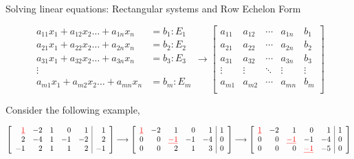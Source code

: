 \documentclass[aspectratio=169]{beamer}
\begin{document}
\begin{frame}[t]{Solving linear equations: Rectangular systems and Row Echelon Form}
\vspace{-0.5cm}
\begin{small}
\[
\begin{split}
a_{11}x_1 + a_{12}x_2 \ldots + a_{1n}x_n & = b_1 : E_1\\
a_{21}x_1 + a_{22}x_2 \ldots + a_{2n}x_n & = b_2 : E_2\\
a_{31}x_1 + a_{32}x_2 \ldots + a_{3n}x_n & = b_3 : E_3\\
\vdots &  \\
a_{m1}x_1 + a_{m2}x_2 \ldots + a_{mn}x_n & = b_m : E_m\\
\end{split} \longrightarrow
\left[
\begin{array}{cccc|c}
a_{11} & a_{12} & \cdots & a_{1n} & b_1 \\
a_{21} & a_{22} & \cdots & a_{2n} & b_2 \\
a_{31} & a_{32} & \cdots & a_{3n} & b_3 \\
\vdots & \vdots & \ddots & \vdots & \vdots \\
a_{m1} & a_{m2} & \cdots & a_{mn} & b_m \\
\end{array}
\right]
\]
\end{small}

Consider the following example,
\begin{footnotesize}
\[
\left[
\begin{array}{rrrrr|r}
\color{red}{\underline{1}} & -2 & 1 & 0 & 1 & 1 \\
2 & -4 & 1 & -1 & -2 & 2 \\
-1 & 2 & 1 & 1 & 2 & -1 \\
\end{array}
\right] \longrightarrow 
\left[
\begin{array}{rrrrr|r}
\color{red}{\underline{1}} & -2 & 1 & 0 & 1 & 1 \\
0 & 0 & \color{red}{\underline{-1}} & -1 & -4 & 0 \\
0 & 0 & 2 & 1 & 3 & 0 \\
\end{array}
\right] \longrightarrow 
\left[
\begin{array}{rrrrr|r}
\color{red}{\underline{1}} & -2 & 1 & 0 & 1 & 1 \\
0 & 0 & \color{red}{\underline{-1}} & -1 & -4 & 0 \\
0 & 0 & 0 & \color{red}{\underline{-1}} & -5 & 0 \\
\end{array}
\right]
\]
\end{footnotesize}
\end{frame}
\end{document}
